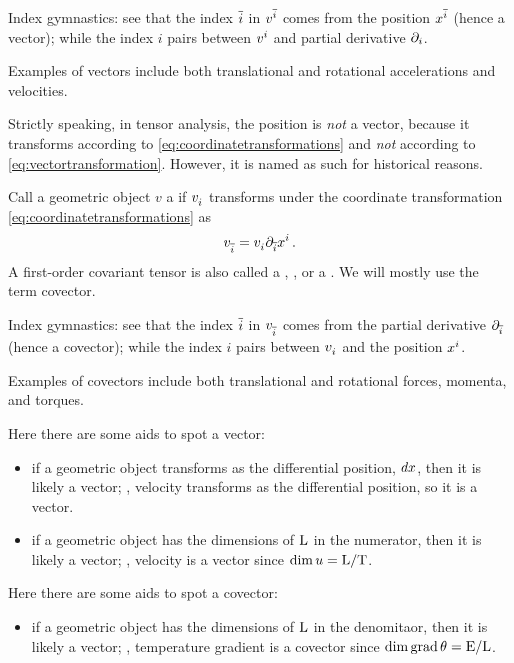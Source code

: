 \begin{note}
  Index gymnastics: see that the index $\bidx i$ in $\atvec v i$ comes from the position $\atvec\pos i$ (hence a vector); while the index $i$ pairs between $\tvec vi$ and partial derivative $\ipd i$.
\end{note}


Examples of vectors include both translational and rotational accelerations and velocities.

\begin{remark}
  Strictly speaking, in tensor analysis, the position  is \emph{not} a vector, because it transforms according to \cref{eq:coordinatetransformations} and \emph{not} according to \cref{eq:vectortransformation}. However, it is named as such for historical reasons.
\end{remark}

\begin{definition}
  Call a geometric object $v$ a  if $\tcov vi$ transforms under the coordinate transformation \cref{eq:coordinatetransformations} as  
  \begin{equation*}
    \atcov v i = \tcov vi\aipd i\tvec\pos i\,.
  \end{equation*}
  A first-order covariant tensor is also called a , , or a . We will mostly use the term covector.
\end{definition}

\begin{note}
  Index gymnastics: see that the index $\bidx i$ in $\atcov v i$ comes from the partial derivative $\aipd i$ (hence a covector); while the index $i$ pairs between $\tcov vi$ and the position $\tvec\pos i$.
\end{note}

Examples of covectors include both translational and rotational forces, momenta, and torques.

\begin{note}
  Here there are some aids to spot a vector:
  \begin{itemize}
    \item if a geometric object transforms as the differential position, $d\pos$, then it is likely a vector; \eg, velocity transforms as the differential position, so it is a vector.
    \item if a geometric object has the dimensions of $\phdim L$ in the numerator, then it is likely a vector; \eg, velocity is a vector since $\dim\vel = \phdim{L/T}$.
  \end{itemize}
  
  Here there are some aids to spot a covector:
  \begin{itemize}
    \item if a geometric object has the dimensions of $\phdim{L}$ in the denomitaor, then it is likely a vector; \eg, temperature gradient is a covector since $\dim\grad\temp = \phdim{E/L}$.
  \end{itemize}
\end{note}


